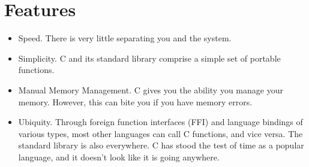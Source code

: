 \section{Features}

\begin{itemize}
	\item Speed. There is very little separating you and the system.
	\item Simplicity.
    C and its standard library comprise a simple set of portable functions.
	\item Manual Memory Management.
    C gives you the ability you manage your memory.
    However, this can bite you if you have memory errors.
  \item Ubiquity.
    Through foreign function interfaces (FFI) and language bindings of various types, most other languages can call C functions, and vice versa.
    The standard library is also everywhere.
    C has stood the test of time as a popular language, and it doesn't look like it is going anywhere.
\end{itemize}


